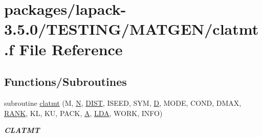 \hypertarget{clatmt_8f}{}\section{packages/lapack-\/3.5.0/\+T\+E\+S\+T\+I\+N\+G/\+M\+A\+T\+G\+E\+N/clatmt.f File Reference}
\label{clatmt_8f}
\subsection*{Functions/\+Subroutines}
\begin{DoxyCompactItemize}
\item 
subroutine \hyperlink{group__complex__matgen_gacbcffc07d8119265fdd7ec81f961e75a}{clatmt} (M, \hyperlink{polmisc_8c_a0240ac851181b84ac374872dc5434ee4}{N}, \hyperlink{superlu__enum__consts_8h_af00a42ecad444bbda75cde1b64bd7e72ac04fbbdf0d80a4ad25e565541deeebd7}{D\+I\+S\+T}, I\+S\+E\+E\+D, S\+Y\+M, \hyperlink{odrpack_8h_a7dae6ea403d00f3687f24a874e67d139}{D}, M\+O\+D\+E, C\+O\+N\+D, D\+M\+A\+X, \hyperlink{splinemodule_8c_a3a88bcc63386de30443dacede2e01847}{R\+A\+N\+K}, K\+L, K\+U, P\+A\+C\+K, \hyperlink{classA}{A}, \hyperlink{example__user_8c_ae946da542ce0db94dced19b2ecefd1aa}{L\+D\+A}, W\+O\+R\+K, I\+N\+F\+O)
\begin{DoxyCompactList}\small\item\em {\bfseries C\+L\+A\+T\+M\+T} \end{DoxyCompactList}\end{DoxyCompactItemize}
